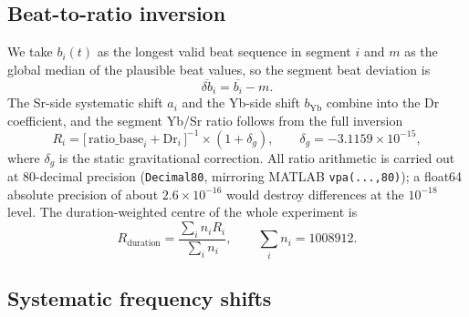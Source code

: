\documentclass[11pt,a4paper]{article}
\newcommand{\Rdur}{R_{\mathrm{duration}}}
\newcommand{\e}[1]{\times 10^{#1}}
\begin{document}
\subsection{Beat-to-ratio inversion}
\label{app:methods-ratio}
We take $b_i(t)$ as the longest valid beat sequence in segment $i$ and
$m$ as the global median of the plausible beat values, so the segment beat
deviation is
\begin{equation}
  \overline{\delta b}_i = \overline{b_i} - m .
\end{equation}
The Sr-side systematic shift $a_i$ and the Yb-side shift $b_{\mathrm{Yb}}$
combine into the Dr coefficient, and the segment Yb/Sr ratio follows from
the full inversion
\begin{equation}
  R_i = \bigl[\,\mathrm{ratio\_base}_i + \mathrm{Dr}_i\,\bigr]^{-1}
        \times (1+\delta_g),
  \qquad \delta_g = -3.1159\e{-15},
  \label{eq:ratio}
\end{equation}
where $\delta_g$ is the static gravitational correction. All ratio
arithmetic is carried out at 80-decimal precision (\texttt{Decimal80},
mirroring MATLAB \texttt{vpa(...,80)}); a float64 absolute precision of
about $2.6\e{-16}$ would destroy differences at the $10^{-18}$ level. The
duration-weighted centre of the whole experiment is
\begin{equation}
  \Rdur = \frac{\sum_i n_i R_i}{\sum_i n_i},
  \qquad \sum_i n_i = \num{1008912}.
  \label{eq:rduration}
\end{equation}


\subsection{Systematic frequency shifts}
\label{app:systematics}
\end{document}
